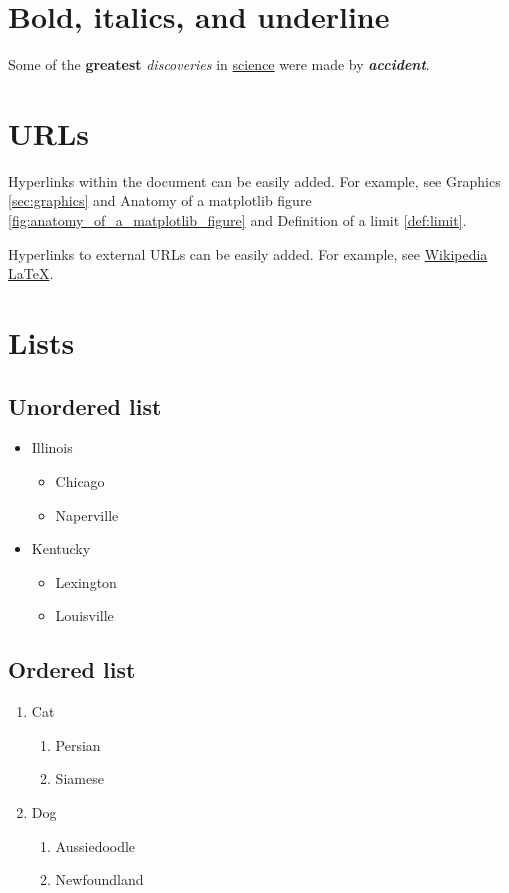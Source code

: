 \documentclass[10pt, letterpaper, twoside]{article}
\theoremstyle{myenv}
\theoremstyle{mytheorem}
\theoremstyle{mydefinition}
\begin{document}
\newpage
\section{Bold, italics, and underline}
\label{sec:bold_italics_underline}
Some of the \textbf{greatest} \textit{discoveries} in \underline{science} were made by \textbf{\textit{accident}}.

\section{URLs}
\label{sec:urls}
Hyperlinks within the document can be easily added. For example, see Graphics \ref{sec:graphics} and Anatomy of a matplotlib figure \ref{fig:anatomy_of_a_matplotlib_figure} and Definition of a limit \ref{def:limit}.

Hyperlinks to external URLs can be easily added. For example, see \href{https://en.wikipedia.org/wiki/Latex}{Wikipedia \LaTeX}.
\section{Lists}
\subsection{Unordered list}
\label{sec:unordered_list}
\begin{itemize}
    \item Illinois
        \begin{itemize}
            \item Chicago
            \item Naperville
        \end{itemize}
    \item Kentucky
        \begin{itemize}
            \item Lexington
            \item Louisville
        \end{itemize}
\end{itemize}

\subsection{Ordered list}
\label{sec:ordered_list}
\begin{enumerate}
    \item Cat
        \begin{enumerate}
            \item Persian
            \item Siamese
        \end{enumerate}
    \item Dog
        \begin{enumerate}
            \item Aussiedoodle
            \item Newfoundland
        \end{enumerate}
\end{enumerate}
\end{document}
